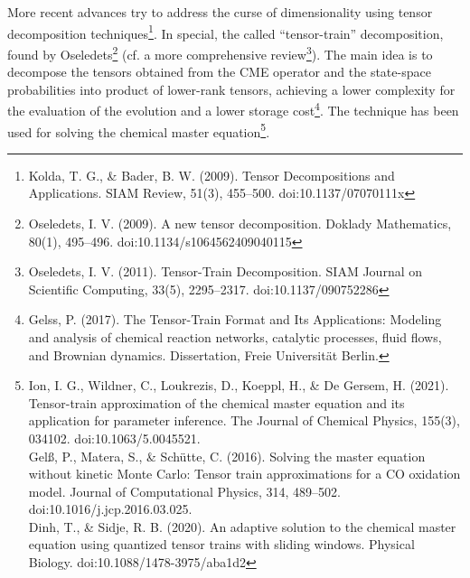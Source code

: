 \documentclass[11pt]{amsart}
\begin{document}
More recent advances try to address the curse of dimensionality using tensor decomposition techniques\footnote{Kolda, T. G., \& Bader, B. W. (2009). Tensor Decompositions and Applications. SIAM Review, 51(3), 455–500. doi:10.1137/07070111x }. In special, the called ``tensor-train'' decomposition, found by Oseledets\footnote{Oseledets, I. V. (2009). A new tensor decomposition. Doklady Mathematics, 80(1), 495–496. doi:10.1134/s1064562409040115} (cf. a more comprehensive review\footnote{Oseledets, I. V. (2011). Tensor-Train Decomposition. SIAM Journal on Scientific Computing, 33(5), 2295–2317. doi:10.1137/090752286}). The main idea is to decompose the tensors obtained from the CME operator and the state-space probabilities into product of lower-rank tensors, achieving a lower complexity for the evaluation of the evolution and a lower storage cost\footnote{Gelss, P. (2017). The Tensor-Train Format and Its Applications: Modeling and analysis of chemical reaction networks, catalytic processes, fluid flows, and Brownian dynamics. Dissertation, Freie Universität Berlin.}. The technique has been used for solving the chemical master equation\footnote{Ion, I. G., Wildner, C., Loukrezis, D., Koeppl, H., \& De Gersem, H. (2021). Tensor-train approximation of the chemical master equation and its application for parameter inference. The Journal of Chemical Physics, 155(3), 034102. doi:10.1063/5.0045521. \\ Gelß, P., Matera, S., \& Schütte, C. (2016). Solving the master equation without kinetic Monte Carlo: Tensor train approximations for a CO oxidation model. Journal of Computational Physics, 314, 489–502. doi:10.1016/j.jcp.2016.03.025. \\ Dinh, T., \& Sidje, R. B. (2020). An adaptive solution to the chemical master equation using quantized tensor trains with sliding windows. Physical Biology. doi:10.1088/1478-3975/aba1d2 }.
\end{document}
